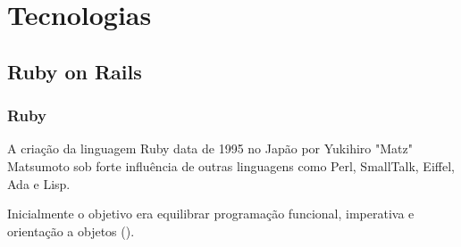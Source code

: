 \chapter{Tecnologias}
\label{cap:tecnologias}
\section{Ruby on Rails}
\subsection{Ruby}
    \par A criação da linguagem Ruby data de 1995 no Japão por Yukihiro "Matz" Matsumoto sob forte influência de outras linguagens como Perl, SmallTalk, Eiffel, Ada e Lisp.
    \par Inicialmente o objetivo era equilibrar programação funcional, imperativa e orientação a objetos (\cite{rubydocs}).
